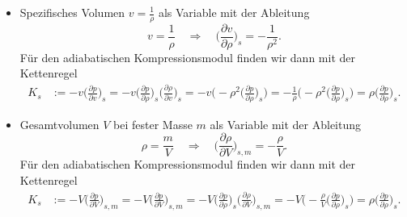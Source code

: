 \begin{itemize}
    \item Spezifisches Volumen $v = \frac{1}{\rho}$ als Variable mit der
    Ableitung
    \[
    v=\frac{1}{\rho}
    \quad\Rightarrow\quad
    \biggl(\frac{\partial v}{\partial \rho}\biggr)_{s} = -\frac{1}{\rho^2}.
    \]
    Für den adiabatischen Kompressionsmodul finden wir dann mit der 
    Kettenregel
\begin{align*}
    K_s &:= -v\biggl( \frac{\partial p}{\partial v} \biggr)_{s}
    = -v\biggl(\frac{\partial p}{\partial \rho}\biggr)_{s}
	\biggl(\frac{\partial \rho}{\partial v}\biggr)_{s}
    = -v\biggl(-\rho^2\biggl(\frac{\partial p}{\partial \rho}\biggr)_{s}\biggr)
    = -\frac{1}{\rho}\biggl(
	-\rho^2\biggl(\frac{\partial p}{\partial \rho}\biggr)_{s}
      \biggr)
    = \rho\biggl(\frac{\partial p}{\partial \rho}\biggr)_{s}.
\end{align*}

\item Gesamtvolumen $V$ bei fester Masse $m$ als Variable mit der Ableitung
    \[
\rho=\frac{m}{V}
    \quad\Rightarrow\quad
    \biggl(\frac{\partial \rho}{\partial V}\biggr)_{s,m} = -\frac{\rho}{V}.
    \]
Für den adiabatischen Kompressionsmodul finden wir dann mit der Kettenregel
\begin{align*}
    K_s &:= -V\biggl(\frac{\partial p}{\partial V}\biggr)_{s,m}
=
    -V\biggl(\frac{\partial p}{\partial V}\biggr)_{s,m}
=
-V\biggl(\frac{\partial p}{\partial \rho}\biggr)_{s}
  \biggl(\frac{\partial \rho}{\partial V}\biggr)_{s,m}
=
-V\biggl( -\frac{\rho}{V}\biggl(\frac{\partial p}{\partial \rho}\biggr)_{s}\biggr)
=
\rho\biggl(\frac{\partial p}{\partial \rho}\biggr)_{s}.
\end{align*}
\end{itemize}
